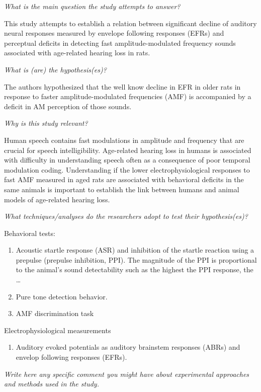 \documentclass[10pt]{article}
\providecommand{\tightlist}{\setlength{\itemsep}{0pt}\setlength{\parskip}{0pt}}%
\begin{document}
\emph{What is the main question the study attempts to answer?}

This study attempts to establish a relation between significant decline
of auditory neural responses measured by envelope following responses
(EFRs) and perceptual deficits in detecting fast amplitude-modulated
frequency sounds associated with age-related hearing loss in rats.

\emph{What is (are) the hypothesis(es)?}

The authors hypothesized that the well know decline in EFR in older rats
in response to faster amplitude-modulated frequencies (AMF) is
accompanied by a deficit in AM perception of those sounds.~~

\emph{Why is this study relevant?}

Human speech contains fast modulations in amplitude and frequency that
are crucial for speech intelligibility. Age-related hearing loss in
humans is associated with difficulty in understanding speech often as a
consequence of poor temporal modulation coding. Understanding if the
lower electrophysiological responses to fast AMF measured in aged rats
are associated with behavioral deficits in the same animals is important
to establish the link between humans and animal models of age-related
hearing loss.

\emph{What techniques/analyses do the researchers adopt to test their
hypothesis(es)?}

Behavioral tests:

\begin{enumerate}
\tightlist
\item
  Acoustic startle response (ASR) and inhibition of the startle reaction
  using a prepulse (prepulse inhibition, PPI). The magnitude of the PPI
  is proportional to the animal's sound detectability such as the
  highest the PPI response, the \ldots{}
\item
  Pure tone detection behavior.
\item
  AMF discrimination task
\end{enumerate}

Electrophysiological measurements

\begin{enumerate}
\tightlist
\item
  Auditory evoked potentials as auditory brainstem responses (ABRs) and
  envelop following responses (EFRs).
\end{enumerate}

\emph{Write here any specific comment you might have about experimental
approaches and methods used in the study.}
\end{document}
